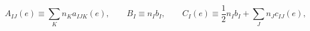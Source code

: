 \begin{equation}
A_{IJ}(e)\equiv \sum_{K}n_{K}a_{IJK}(e),\qquad B_{I}\equiv n_{I}b_{I},\qquad
C_{I}(e)\equiv \frac{1}{2}n_{I}b_{I}+\sum_{J}n_{J}c_{IJ}(e),  \label{AA}
\end{equation}

